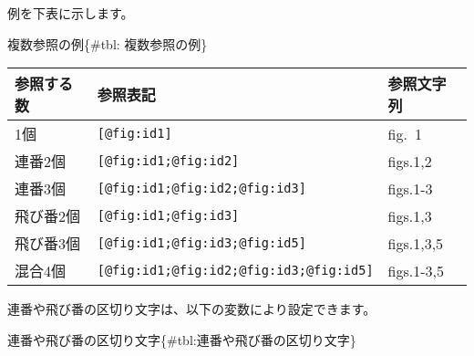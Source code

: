 例を下表に示します。

複数参照の例\{\#tbl: 複数参照の例\}

\begin{longtable}[]{@{}lll@{}}
\toprule\noalign{}
参照する数 & 参照表記 & 参照文字列 \\
\midrule\noalign{}
\endhead
\bottomrule\noalign{}
\endlastfoot
1個 & \texttt{{[}@fig:id1{]}} & fig.~1 \\
連番2個 & \texttt{{[}@fig:id1;@fig:id2{]}} & figs.1,2 \\
連番3個 & \texttt{{[}@fig:id1;@fig:id2;@fig:id3{]}} & figs.1-3 \\
飛び番2個 & \texttt{{[}@fig:id1;@fig:id3{]}} & figs.1,3 \\
飛び番3個 & \texttt{{[}@fig:id1;@fig:id3;@fig:id5{]}} & figs.1,3,5 \\
混合4個 & \texttt{{[}@fig:id1;@fig:id2;@fig:id3;@fig:id5{]}} &
figs.1-3,5 \\
\end{longtable}

連番や飛び番の区切り文字は、以下の変数により設定できます。

連番や飛び番の区切り文字\{\#tbl:連番や飛び番の区切り文字\}

